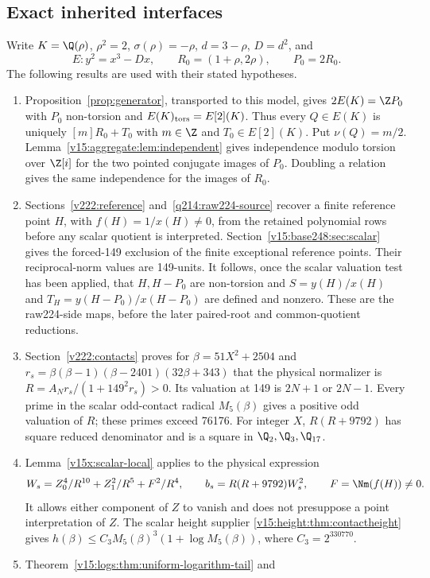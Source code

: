 \subsection{Exact inherited interfaces}\label{q198:inherited}
Write $K=\Q(\rho)$, $\rho^2=2$, $\sigma(\rho)=-\rho$,
$d=3-\rho$, $D=d^2$, and
\[
 E:y^2=x^3-Dx,\qquad R_0=(1+\rho,2\rho),\qquad P_0=2R_0.
\]
The following results are used with their stated hypotheses.
\begin{enumerate}
\item Proposition~\ref{prop:generator}, transported to this model,
gives $2E(K)=\Z P_0$ with $P_0$ non-torsion and $E(K)_{\rm tors}=E[2](K)$.
Thus every $Q\in E(K)$ is uniquely $[m]R_0+T_0$ with
$m\in\Z$ and $T_0\in E[2](K)$. Put $\nu(Q)=m/2$.
Lemma~\ref{v15:aggregate:lem:independent} gives independence modulo
torsion over $\Z[i]$ for the two pointed conjugate images of $P_0$.
Doubling a relation gives the same independence for the images of $R_0$.
\item Sections~\ref{v222:reference} and~\ref{q214:raw224-source}
recover a finite reference point $H$, with $f(H)=1/x(H)\ne0$, from
the retained polynomial rows before any scalar quotient is interpreted.
Section~\ref{v15:base248:sec:scalar} gives the forced-149 exclusion
of the finite exceptional reference points. Their reciprocal-norm
values are 149-units. It follows, once the scalar valuation test has
been applied, that $H,H-P_0$ are non-torsion and
$S=y(H)/x(H)$ and $T_H=y(H-P_0)/x(H-P_0)$ are defined and nonzero.
These are the raw224-side maps, before the later paired-root and
common-quotient reductions.
\item Section~\ref{v222:contacts} proves for
$\beta=51X^2+2504$ and
$r_s=\beta(\beta-1)(\beta-2401)(32\beta+343)$ that the physical
normalizer is $R=A_Nr_s/(1+149^2r_s)>0$.
Its valuation at 149 is $2N+1$ or $2N-1$.
Every prime in the scalar odd-contact radical $M_5(\beta)$ gives a
positive odd valuation of $R$; these primes exceed 76176.
For integer $X$, $R(R+9792)$ has square reduced denominator and is
a square in $\Q_2,\Q_3,\Q_{17}$.
\item Lemma~\ref{v15x:scalar-local} applies to the physical expression
\[
 W_s=Z_0^4/R^{10}+Z_1^2/R^5+F^2/R^4,\qquad
 b_s=R(R+9792)W_s^2,\qquad F=\Nm(f(H))\ne0.
\]
It allows either component of $Z$ to vanish and does not presuppose
a point interpretation of $Z$. The scalar height supplier
\ref{v15:height:thm:contactheight} gives
$h(\beta)\le C_3M_5(\beta)^3(1+\log M_5(\beta))$,
where $C_3=2^{330770}$.
\item Theorem~\ref{v15:logs:thm:uniform-logarithm-tail} and

\end{enumerate}
